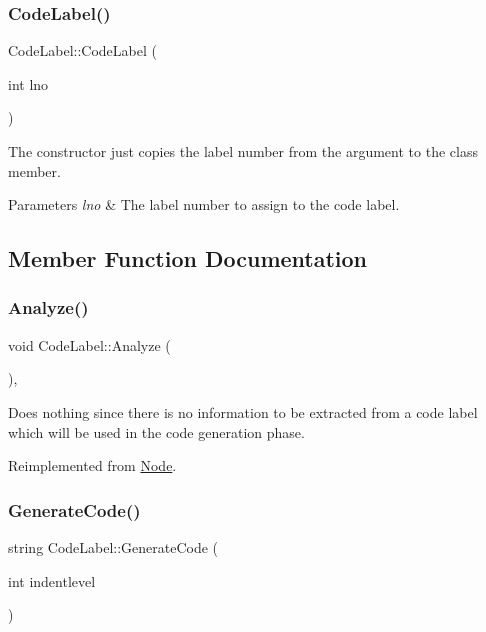\subsubsection{\texorpdfstring{Code\+Label()}{CodeLabel()}}
{\footnotesize\ttfamily Code\+Label\+::\+Code\+Label (\begin{DoxyParamCaption}\item[{int}]{lno }\end{DoxyParamCaption})\hspace{0.3cm}{\ttfamily [inline]}}

The constructor just copies the label number from the argument to the class member. 
\begin{DoxyParams}{Parameters}
{\em lno} & The label number to assign to the code label. \\
\hline
\end{DoxyParams}


\subsection{Member Function Documentation}
\mbox{\label{class_code_label_a7318d2169f33b5296d9f98e17213f634}} 
\subsubsection{\texorpdfstring{Analyze()}{Analyze()}}
{\footnotesize\ttfamily void Code\+Label\+::\+Analyze (\begin{DoxyParamCaption}{ }\end{DoxyParamCaption})\hspace{0.3cm}{\ttfamily [inline]}, {\ttfamily [virtual]}}

Does nothing since there is no information to be extracted from a code label which will be used in the code generation phase. 

Reimplemented from \hyperlink{class_node_a5f88d55c6f253a29def7ccc443d83d47}{Node}.

\mbox{\label{class_code_label_a2e6b55e59cbf6213ed5b3e9fc9d8181c}} 
\subsubsection{\texorpdfstring{Generate\+Code()}{GenerateCode()}}
{\footnotesize\ttfamily string Code\+Label\+::\+Generate\+Code (\begin{DoxyParamCaption}\item[{int}]{indentlevel }\end{DoxyParamCaption})\hspace{0.3cm}{\ttfamily [virtual]}}

